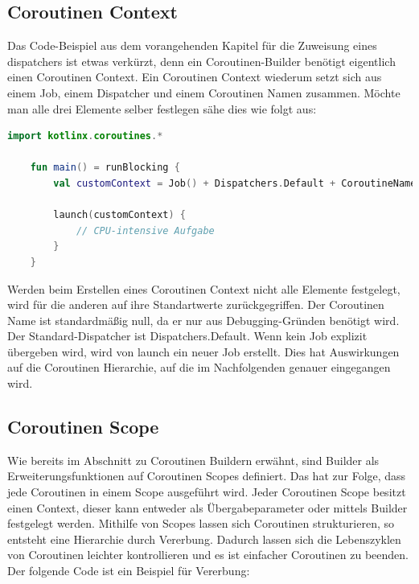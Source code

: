 \documentclass[fontsize=12pt,paper=a4,twoside=semi,parskip=half-,headsepline,headinclude]{scrreprt}
\begin{document}
\subsection{Coroutinen Context}

Das Code-Beispiel aus dem vorangehenden Kapitel für die Zuweisung eines dispatchers ist etwas verkürzt, denn ein Coroutinen-Builder benötigt eigentlich einen Coroutinen Context. Ein Coroutinen Context wiederum setzt sich aus einem Job, einem Dispatcher und einem Coroutinen Namen zusammen. Möchte man alle drei Elemente selber festlegen sähe dies wie folgt aus:

\begin{lstlisting}[language=Kotlin]
	import kotlinx.coroutines.*

	fun main() = runBlocking {
		val customContext = Job() + Dispatchers.Default + CoroutineName("MyCoroutine")
	
		launch(customContext) {
			// CPU-intensive Aufgabe
		}
	}
\end{lstlisting}

Werden beim Erstellen eines Coroutinen Context nicht alle Elemente festgelegt, wird für die anderen auf ihre Standartwerte zurückgegriffen. Der Coroutinen Name ist standardmäßig null, da er nur aus Debugging-Gründen benötigt wird. Der Standard-Dispatcher ist Dispatchers.Default. Wenn kein Job explizit übergeben wird, wird von launch ein neuer Job erstellt. Dies hat Auswirkungen auf die Coroutinen Hierarchie, auf die im Nachfolgenden genauer eingegangen wird.

\subsection{Coroutinen Scope}

Wie bereits im Abschnitt zu Coroutinen Buildern erwähnt, sind Builder als Erweiterungsfunktionen auf Coroutinen Scopes definiert. Das hat zur Folge, dass jede Coroutinen in einem Scope ausgeführt wird. Jeder Coroutinen Scope besitzt einen Context, dieser kann entweder als Übergabeparameter oder mittels Builder festgelegt werden. Mithilfe von Scopes lassen sich Coroutinen strukturieren, so entsteht eine Hierarchie durch Vererbung. Dadurch lassen sich die Lebenszyklen von Coroutinen leichter kontrollieren und es ist einfacher Coroutinen zu beenden. Der folgende Code ist ein Beispiel für Vererbung:
\end{document}
